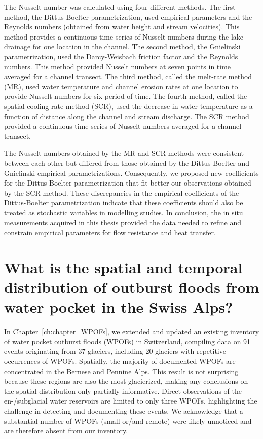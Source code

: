 The Nusselt number was calculated using four different methods. The first method, the Dittus-Boelter parametrization, used empirical parameters and the Reynolds numbers (obtained from water height and stream velocities). This method provides a continuous time series of Nusselt numbers during the lake drainage for one location in the channel. The second method, the Gnielinski parametrization, used the Darcy-Weisbach friction factor and the Reynolds numbers. This method provided Nusselt numbers at seven points in time averaged for a channel transect. The third method, called the melt-rate method (MR), used water temperature and channel erosion rates at one location to provide Nusselt numbers for six period of time. The fourth method, called the spatial-cooling rate method (SCR), used the decrease in water temperature as a function of distance along the channel and stream discharge. The SCR method provided a continuous time series of Nusselt numbers averaged for a channel transect.
%

The Nusselt numbers obtained by the MR and SCR methods were consistent between each other but differed from those obtained by the Dittus-Boelter and Gnielinski empirical parametrizations. Consequently, we proposed new coefficients for the Dittus-Boelter parametrization that fit better our observations obtained by the SCR method. These discrepancies in the empirical coefficients of the Dittus-Boelter parametrization indicate that these coefficients should also be treated as stochastic variables in modelling studies. In conclusion, the in situ measurements acquired in this thesis provided the data needed to refine and constrain empirical parameters for flow resistance and heat transfer. 


\section{What is the spatial and temporal distribution of outburst floods from water pocket in the Swiss Alps?}

In Chapter~\ref{ch:chapter_WPOFs}, we extended and updated an existing inventory of water pocket outburst floods (WPOFs) in Switzerland, compiling data on 91 events originating from 37 glaciers, including 20 glaciers with repetitive occurrences of WPOFs. Spatially, the majority of documented WPOFs are concentrated in the Bernese and Pennine Alps. This result is not surprising because these regions are also the most glacierized, making any conclusions on the spatial distribution only partially informative. Direct observations of the en-/subglacial water reservoirs are limited to only three WPOFs, highlighting the challenge in detecting and documenting these events. We acknowledge that a substantial number of WPOFs (small or/and remote) were likely unnoticed and are therefore absent from our inventory. 
%

